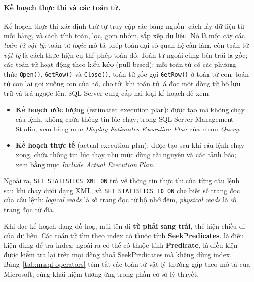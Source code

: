 \paragraph{Kế hoạch thực thi và các toán tử.}
Kế hoạch thực thi xác định thứ tự truy cập các bảng nguồn, cách lấy dữ liệu từ mỗi bảng, và cách tính toán, lọc, gom nhóm, sắp xếp dữ liệu. Nó là một cây các \textit{toán tử vật lý}: toán tử \textit{logic} mô tả phép toán đại số quan hệ cần làm, còn toán tử \textit{vật lý} là cách thực hiện cụ thể phép toán đó. Toán tử ngoài cùng bên trái là gốc; các toán tử hoạt động theo kiểu \textbf{kéo} (pull-based): mỗi toán tử có các phương thức \texttt{Open()}, \texttt{GetRow()} và \texttt{Close()}, toán tử gốc gọi \texttt{GetRow()} ở toán tử con, toán tử con lại gọi xuống con của nó, cho tới khi toán tử lá đọc một dòng từ bộ lưu trữ và trả ngược lên. SQL Server cung cấp hai loại kế hoạch để xem:
\begin{itemize}
    \item \textbf{Kế hoạch ước lượng} (estimated execution plan): được tạo mà không chạy câu lệnh, không chứa thông tin lúc chạy; trong SQL Server Management Studio, xem bằng mục \textit{Display Estimated Execution Plan} của menu \textit{Query}.
    \item \textbf{Kế hoạch thực tế} (actual execution plan): được tạo sau khi câu lệnh chạy xong, chứa thông tin lúc chạy như mức dùng tài nguyên và các cảnh báo; xem bằng mục \textit{Include Actual Execution Plan}.
\end{itemize}
Ngoài ra, \texttt{SET STATISTICS XML ON} trả về thông tin thực thi của từng câu lệnh sau khi chạy dưới dạng XML, và \texttt{SET STATISTICS IO ON} cho biết số trang đọc của câu lệnh: \textit{logical reads} là số trang đọc từ bộ nhớ đệm, \textit{physical reads} là số trang đọc từ đĩa.

Khi đọc kế hoạch dạng đồ hoạ, mũi tên đi \textbf{từ phải sang trái}, thể hiện chiều đi của dữ liệu. Các toán tử tìm theo index có thuộc tính \textbf{SeekPredicates}, là điều kiện dùng để tra index; ngoài ra có thể có thuộc tính \textbf{Predicate}, là điều kiện được kiểm tra lại trên mọi dòng thoả SeekPredicates mà không dùng index. Bảng~\ref{tab:mssql-operators} tóm tắt các toán tử vật lý thường gặp theo mô tả của Microsoft, cùng khái niệm tương ứng trong phần cơ sở lý thuyết.

